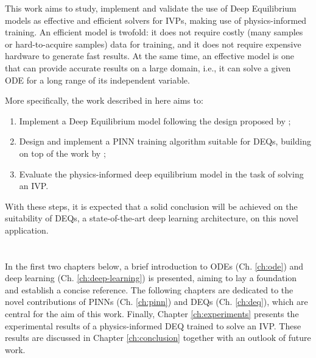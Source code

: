 This work aims to study, implement and validate the use of Deep Equilibrium models as effective and efficient solvers for \gls{IVP}s, making use of physics-informed training.
An efficient model is twofold: it does not require costly (many samples or hard-to-acquire samples) data for training, and it does not require expensive hardware to generate fast results.
At the same time, an effective model is one that can provide accurate results on a large domain, i.e., it can solve a given \gls{ODE} for a long range of its independent variable.

More specifically, the work described in here aims to:
\begin{enumerate}
    \item Implement a Deep Equilibrium model following the design proposed by \textcite{Bai2019};
    \item Design and implement a \gls{PINN} training algorithm suitable for \gls{DEQ}s, building on top of the work by \textcite{Raissi2019};
    \item Evaluate the physics-informed deep equilibrium model in the task of solving an \gls{IVP}.
\end{enumerate}
With these steps, it is expected that a solid conclusion will be achieved on the suitability of \gls{DEQ}s, a state-of-the-art deep learning architecture, on this novel application.





\section*{}

In the first two chapters below, a brief introduction to \gls{ODE}s (Ch. \ref{ch:ode}) and deep learning (Ch. \ref{ch:deep-learning}) is presented, aiming to lay a foundation and establish a concise reference.
The following chapters are dedicated to the novel contributions of \gls{PINN}s (Ch. \ref{ch:pinn}) and \gls{DEQ}s (Ch. \ref{ch:deq}), which are central for the aim of this work.
Finally, Chapter \ref{ch:experiments} presents the experimental results of a physics-informed \gls{DEQ} trained to solve an \gls{IVP}.
These results are discussed in Chapter \ref{ch:conclusion} together with an outlook of future work.
